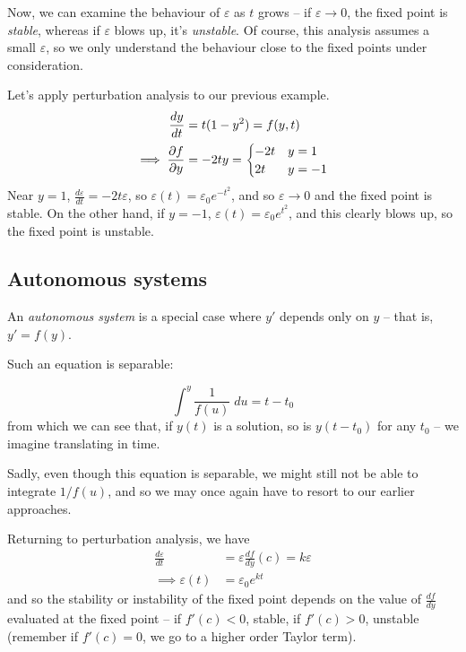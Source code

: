 \documentclass{../template/note}
\begin{document}
    Now, we can examine the behaviour of \(\varepsilon\) as \(t\) grows -- if \(\varepsilon \to 0\), the fixed point is \emph{stable}, whereas if \(\varepsilon\) blows up, it's \emph{unstable}. Of course, this analysis assumes a small \(\varepsilon\), so we only understand the behaviour close to the fixed points under consideration.

    \begin{example}
        Let's apply perturbation analysis to our previous example.
        \begin{align*}
            \frac{dy}{dt} &= t(1-y^2) = f(y, t) \\
            \implies \pd{f}{y} &= -2ty = \begin{cases}
                -2t & y = 1 \\
                2t & y = -1
            \end{cases}
        \end{align*}
        Near \(y=1\), \(\frac{d\varepsilon}{dt} = -2t\varepsilon\), so \(\varepsilon(t) = \varepsilon_0 e^{-t^2}\), and so \(\varepsilon \to 0\) and the fixed point is stable. On the other hand, if \(y=-1\), \(\varepsilon(t) = \varepsilon_0 e^{t^2}\), and this clearly blows up, so the fixed point is unstable.    
    \end{example}
    
    \subsection{Autonomous systems}

    An \emph{autonomous system} is a special case where \(y'\) depends only on \(y\) -- that is, \(y' = f(y)\).

    Such an equation is separable:

    \[
        \int^y \frac{1}{f(u)} \; du = t - t_0
    \]
    from which we can see that, if \(y(t)\) is a solution, so is \(y(t - t_0)\) for any \(t_0\) -- we imagine translating in time.

    Sadly, even though this equation is separable, we might still not be able to integrate \(1/f(u)\), and so we may once again have to resort to our earlier approaches.

    Returning to perturbation analysis, we have
    \begin{align*}
        \frac{d\varepsilon}{dt} &= \varepsilon \frac{df}{dy}(c) = k\varepsilon \\
        \implies \varepsilon(t) &= \varepsilon_0 e^{kt}
    \end{align*}
    and so the stability or instability of the fixed point depends on the value of \(\frac{df}{dy}\) evaluated at the fixed point -- if \(f'(c) < 0\), stable, if \(f'(c) > 0\), unstable (remember if \(f'(c) = 0\), we go to a higher order Taylor term).
    
\end{document}
